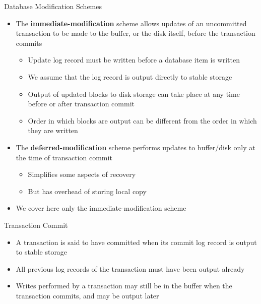 \documentclass[aspectratio=169, xcolor=dvipsnames]{beamer}
\begin{document}
\begin{frame}{Database Modification Schemes}
    \begin{itemize}[<+->]
        \item The \textbf{immediate-modification} scheme allows updates of an uncommitted transaction to be made to the buffer, or the disk itself, before the transaction commits
        \begin{itemize}
            \item[$\triangleright$] Update log record must be written before a database item is written
            \item[$\triangleright$] We assume that the log record is output directly to stable storage
            \item[$\triangleright$] Output of updated blocks to disk storage can take place at any time before or after transaction commit
            \item[$\triangleright$] Order in which blocks are output can be different from the order in which they are written
        \end{itemize}
        \item The \textbf{deferred-modification} scheme performs updates to buffer/disk only at the time of transaction commit
        \begin{itemize}
            \item[$\triangleright$] Simplifies some aspects of recovery
            \item[$\triangleright$] But has overhead of storing local copy
        \end{itemize}
        \item We cover here only the immediate-modification scheme
    \end{itemize}
\end{frame}

\begin{frame}{Transaction Commit}
    \begin{itemize}[<+->]
        \item A transaction is said to have committed when its commit log record is output to stable storage
        \item All previous log records of the transaction must have been output already
        \item Writes performed by a transaction may still be in the buffer when the transaction commits, and may be output later
    \end{itemize}
\end{frame}
\end{document}
